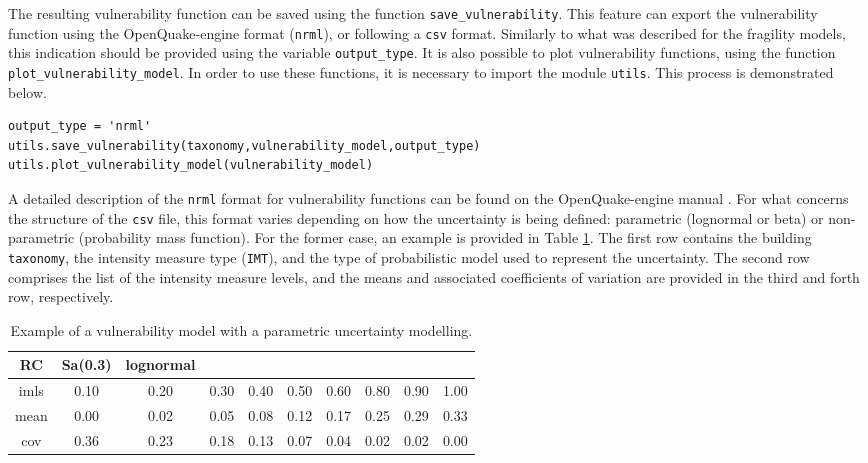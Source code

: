 The resulting vulnerability function can be saved using the function \verb=save_vulnerability=. This feature can export the vulnerability function using the OpenQuake-engine format (\verb=nrml=), or following a \verb=csv= format. Similarly to what was described for the fragility models, this indication should be provided using the variable \verb=output_type=. It is also possible to plot vulnerability functions, using the function \verb=plot_vulnerability_model=. In order to use these functions, it is necessary to import the module \verb=utils=. This process is demonstrated below.

\begin{Verbatim}[frame=single, commandchars=\\\{\}, samepage=true]
output_type = 'nrml'
utils.save_vulnerability(taxonomy,vulnerability_model,output_type)
utils.plot_vulnerability_model(vulnerability_model)
\end{Verbatim}

A detailed description of the \verb=nrml= format for vulnerability functions can be found on the OpenQuake-engine manual \citep{GEM2015}. For what concerns the structure of the \verb=csv= file, this format varies depending on how the uncertainty is being defined: parametric (lognormal or beta) or non-parametric (probability mass function). For the former case, an example is provided in Table \ref{table:vf_cont_csv}. The first row contains the building \verb=taxonomy=, the intensity measure type (\verb=IMT=), and the type of probabilistic model used to represent the uncertainty. The second row comprises the list of the intensity measure levels, and the means and associated coefficients of variation are provided in the third and forth row, respectively.

\begin {table}[htb]
\caption{Example of a vulnerability model with a parametric uncertainty modelling.}
\label{table:vf_cont_csv}
\begin{center}
  \begin{tabular}{ | c | c | c | c | c | c | c | c | c | c |}
  \hline
RC & Sa(0.3) & lognormal &  &  &  &  &  &  & \\ \hline
imls & 0.10 & 0.20 & 0.30 & 0.40 & 0.50 & 0.60 & 0.80 & 0.90 & 1.00\\ \hline
mean & 0.00 & 0.02 & 0.05 & 0.08 & 0.12 & 0.17 & 0.25 & 0.29 & 0.33\\ \hline
cov & 0.36 & 0.23 & 0.18 & 0.13 & 0.07 & 0.04 & 0.02 & 0.02 & 0.00\\ \hline
  \end{tabular}
\end{center}
\end{table}

